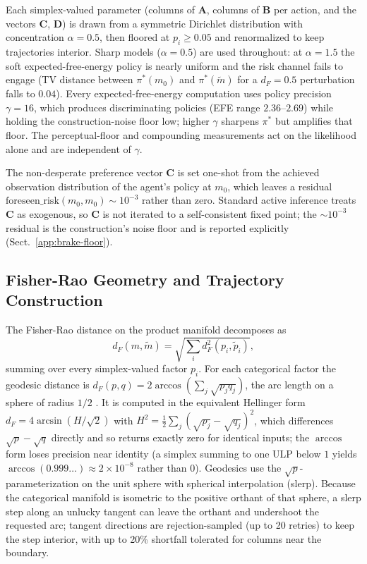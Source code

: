 \documentclass[runningheads]{llncs}
\begin{document}
Each simplex-valued parameter (columns of $\mathbf{A}$, columns of
$\mathbf{B}$ per action, and the vectors $\mathbf{C}$, $\mathbf{D}$) is
drawn from a symmetric Dirichlet distribution with concentration
$\alpha = 0.5$, then floored at $p_i \geq 0.05$ and renormalized to keep
trajectories interior. Sharp models ($\alpha = 0.5$) are used throughout:
at $\alpha = 1.5$ the soft expected-free-energy policy is nearly uniform
and the risk channel fails to engage (TV distance between $\pi^*(m_0)$
and $\pi^*(\tilde m)$ for a $d_F = 0.5$ perturbation falls to $0.04$).
Every expected-free-energy computation uses policy precision
$\gamma = 16$, which produces discriminating policies (EFE range
$2.36$--$2.69$) while holding the construction-noise floor low; higher
$\gamma$ sharpens $\pi^*$ but amplifies that floor. The perceptual-floor
and compounding measurements act on the likelihood alone and are
independent of $\gamma$.
 
The non-desperate preference vector $\mathbf{C}$ is set one-shot from
the achieved observation distribution of the agent's policy at $m_0$,
which leaves a residual $\mathrm{foreseen\_risk}(m_0, m_0) \sim 10^{-3}$
rather than zero. Standard active inference treats $\mathbf{C}$ as
exogenous, so $\mathbf{C}$ is not iterated to a self-consistent fixed
point; the $\sim\!10^{-3}$ residual is the construction's noise floor
and is reported explicitly (Sect.~\ref{app:brake-floor}).
 
\subsection{Fisher-Rao Geometry and Trajectory Construction}\label{app:trajectories}
 
The Fisher-Rao distance on the product manifold decomposes as
\begin{equation}
d_F(m, \tilde m) = \sqrt{ \sum_i d_F^2(p_i, \tilde p_i) },
\end{equation}
summing over every simplex-valued factor $p_i$. For each categorical
factor the geodesic distance is $d_F(p, q) = 2 \arccos(\sum_j \sqrt{p_j
q_j})$, the arc length on a sphere of radius $1/2$ \cite{amari2016,cencov1982}. It is computed in the equivalent Hellinger form
$d_F = 4 \arcsin(H/\sqrt{2})$ with $H^2 = \tfrac{1}{2}\sum_j (\sqrt{p_j}
- \sqrt{q_j})^2$, which differences $\sqrt{p} - \sqrt{q}$ directly and so
returns exactly zero for identical inputs; the $\arccos$ form loses
precision near identity (a simplex summing to one ULP below $1$ yields
$\arccos(0.999\ldots) \approx 2 \times 10^{-8}$ rather than $0$).
Geodesics use the $\sqrt{p}$-parameterization on the unit sphere with
spherical interpolation (slerp). Because the categorical manifold is
isometric to the positive orthant of that sphere, a slerp step along an
unlucky tangent can leave the orthant and undershoot the requested arc;
tangent directions are rejection-sampled (up to 20 retries) to keep the
step interior, with up to 20\% shortfall tolerated for columns near the
boundary.
 
\end{document}
